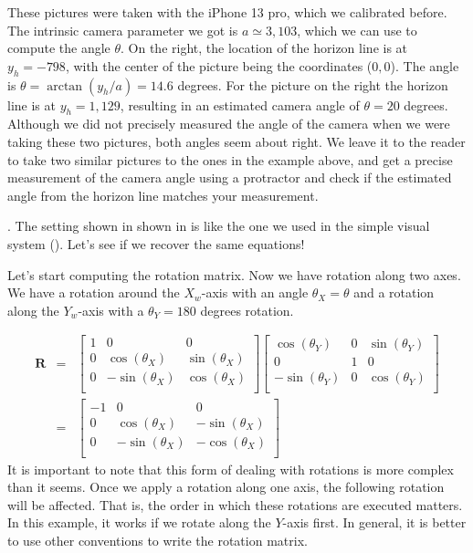 These pictures were taken with the iPhone 13 pro, which we calibrated before. The intrinsic camera parameter we got is $a  \simeq 3{,}103$, which we can use to compute the angle $\theta$. On the right, the location of the horizon line is at $y_h=-798$, with the center of the picture being the coordinates ($0,0$). The angle is $\theta = \arctan (y_h/a)=14.6$ degrees. For the picture on the right the horizon line is at $y_h=1{,}129$, resulting in an estimated camera angle of $\theta=20$ degrees. Although we did not precisely measured the angle of the camera when we were taking these two pictures, both angles seem about right. We leave it to the reader to take two similar pictures to the ones in the example above, and get a precise measurement of the camera angle using a protractor and check if the estimated angle from the horizon line matches your measurement.  


. The setting shown in shown in  is like the one we used in the simple visual system (\chap{\ref{chapter:simplesystem}}). Let's see if we recover the same equations!

Let's start computing the rotation matrix. Now we have rotation along two axes. We have a rotation around the $X_w$-axis with an angle $\theta_X=\theta$ and a rotation along the $Y_w$-axis with a $\theta_Y = 180$ degrees rotation. 

\begin{eqnarray}
    \mathbf{R}
    &=&        
    \begin{bmatrix}
    1 & 0 & 0 \\
    0 & \cos (\theta_X) & \sin (\theta_X)  \\
    0 & -\sin (\theta_X) & \cos (\theta_X) \\
    \end{bmatrix}
    \begin{bmatrix}
    \cos (\theta_Y) & 0 & \sin (\theta_Y) \\
    0 & 1 & 0  \\
    -\sin (\theta_Y) & 0 & \cos (\theta_Y) \\
    \end{bmatrix}
    \nonumber \\
    &=& 
    \begin{bmatrix}
    -1 & 0 & 0 \\
    0 & \cos (\theta_X) & -\sin (\theta_X)  \\
    0 & -\sin (\theta_X) & -\cos (\theta_X) \\
    \end{bmatrix}
\end{eqnarray}
It is important to note that this form of dealing with rotations is more complex than it seems. Once we apply a rotation along one axis, the following rotation will be affected. That is, the order in which these rotations are executed matters. In this example, it works if we rotate along the $Y$-axis first. In general, it is better to use other conventions to write the rotation matrix. 

